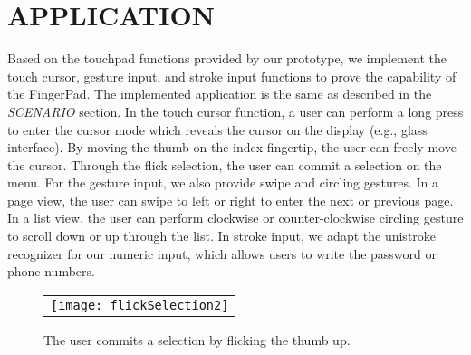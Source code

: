






\section{APPLICATION}
Based on the touchpad functions provided by our prototype, we implement the touch cursor, gesture input, and stroke input functions to prove the capability of the FingerPad. 
The implemented application is the same as described in the \emph{SCENARIO} section.
 In the touch cursor function, a user can perform a long press to enter the cursor mode which reveals the cursor on the display (e.g., glass interface). 
 By moving the thumb on the index fingertip, the user can freely move the cursor. 
 Through the flick selection, the user can commit a selection on the menu. 
 For the gesture input, we also provide swipe and circling gestures. 
 In a page view, the user can swipe to left or right to enter the next or previous page. 
 In a list view, the user can perform clockwise or counter-clockwise circling gesture to scroll down or up through the list. 
 In stroke input, we adapt the unistroke recognizer \cite{Wobbrock:2007} for our numeric input, which allows users to write the password or phone numbers. 

\begin{figure}
\begin{center}
  \begin{tabular}{@{\hspace{0.1cm}}c}
		\texttt{[image: flickSelection2]}\\
   \end{tabular}
\caption{The user commits a selection by flicking the thumb up.}
\label{fig:flickSelection}
\end{center}
\end{figure}

